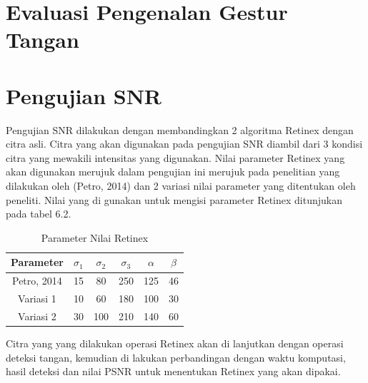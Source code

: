 \section{Evaluasi Pengenalan Gestur Tangan}
\section{Pengujian SNR}
Pengujian SNR dilakukan dengan membandingkan 2 algoritma Retinex dengan citra asli. Citra yang akan digunakan pada pengujian SNR diambil dari 3 kondisi citra yang mewakili intensitas yang digunakan. Nilai parameter Retinex yang akan digunakan merujuk dalam pengujian ini merujuk pada penelitian yang dilakukan oleh (Petro, 2014) dan 2 variasi nilai parameter yang ditentukan oleh peneliti. Nilai yang di gunakan untuk mengisi parameter Retinex ditunjukan pada tabel 6.2.
\begin{table}[H]
	\caption{Parameter Nilai Retinex}
	\vspace{0cm}
	\centering
	\begin{tabular}{|c|c|c|c|c|c|} 
		\hline  Parameter&$\sigma_{1}$ & $\sigma_{2}$ &$\sigma_{3}$ &$\alpha$ &$\beta$\\
		\hline  Petro, 2014&15& 80 &250 & 125& 46\\ 
		\hline  Variasi 1&10 &60&180&100&30\\
		\hline	Variasi 2&30&100&210&140&60\\
		\hline
	\end{tabular}
\end{table}
\noindent Citra yang yang dilakukan operasi Retinex akan di lanjutkan dengan operasi deteksi tangan, kemudian di lakukan perbandingan dengan waktu komputasi, hasil deteksi dan nilai PSNR untuk menentukan Retinex yang akan dipakai.

